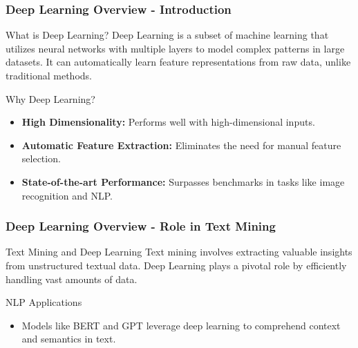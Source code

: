 \documentclass[aspectratio=169]{beamer}
\begin{document}
\begin{frame}[fragile]
    \frametitle{Deep Learning Overview - Introduction}
    \begin{block}{What is Deep Learning?}
        Deep Learning is a subset of machine learning that utilizes neural networks with multiple layers to model complex patterns in large datasets. It can automatically learn feature representations from raw data, unlike traditional methods.
    \end{block}
    
    \begin{block}{Why Deep Learning?}
        \begin{itemize}
            \item \textbf{High Dimensionality:} Performs well with high-dimensional inputs.
            \item \textbf{Automatic Feature Extraction:} Eliminates the need for manual feature selection.
            \item \textbf{State-of-the-art Performance:} Surpasses benchmarks in tasks like image recognition and NLP.
        \end{itemize}
    \end{block}
\end{frame}

\begin{frame}[fragile]
    \frametitle{Deep Learning Overview - Role in Text Mining}
    \begin{block}{Text Mining and Deep Learning}
        Text mining involves extracting valuable insights from unstructured textual data. Deep Learning plays a pivotal role by efficiently handling vast amounts of data.
    \end{block}
    
    \begin{block}{NLP Applications}
        \begin{itemize}
            \item Models like BERT and GPT leverage deep learning to comprehend context and semantics in text.
        \end{itemize}
    \end{block}
\end{frame}
\end{document}
